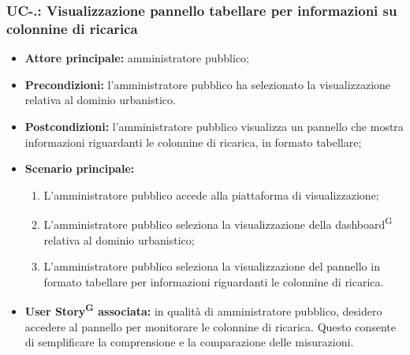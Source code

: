 \documentclass[8pt]{article}
\newcommand{\glossterm}[1]{#1\textsuperscript{G}} %
\begin{document}
\subsubsection*{UC-\theuc .\speconenumber: Visualizzazione pannello tabellare per informazioni su colonnine di ricarica}
\begin{itemize}
    \item \textbf{Attore principale:} amministratore pubblico;
    \item \textbf{Precondizioni:} l'amministratore pubblico ha selezionato la visualizzazione
        relativa al dominio urbanistico.
    \item \textbf{Postcondizioni:} l'amministratore pubblico visualizza un pannello che mostra informazioni riguardanti le colonnine di ricarica, in formato tabellare;
    \item \textbf{Scenario principale:} 
    \begin{enumerate}
    \item L'amministratore pubblico accede alla piattaforma di visualizzazione;
    \item L'amministratore pubblico seleziona la visualizzazione della \glossterm{dashboard} relativa al dominio urbanistico;
    \item L'amministratore pubblico seleziona la visualizzazione del pannello in formato tabellare per informazioni riguardanti le colonnine di ricarica.
    \end{enumerate}
    \item \textbf{\glossterm{User Story} associata:} in qualità di amministratore pubblico, desidero accedere al pannello per monitorare le colonnine di ricarica. Questo consente di semplificare la comprensione e la comparazione delle misurazioni.
\end{itemize}
\end{document}
